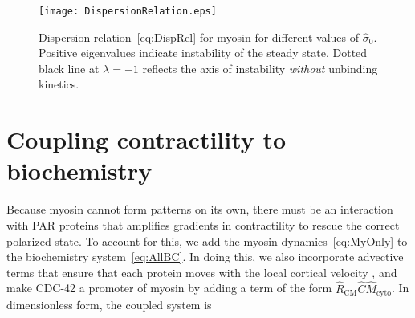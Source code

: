 \documentclass[11pt]{article}
\newcommand{\6}[1]{#1_{\text{6}}}
\newcommand{\3}[1]{#1_{\text{3}}}
\begin{document}
\begin{figure}
\centering
\texttt{[image: DispersionRelation.eps]}
\caption{\label{fig:DispRelMy}Dispersion relation\ \eqref{eq:DispRel} for myosin for different values of $\hat{\sigma}_0$. Positive eigenvalues indicate instability of the steady state. Dotted black line at $\lambda=-1$ reflects the axis of instability \emph{without} unbinding kinetics.}
\end{figure}


\section{Coupling contractility to biochemistry \label{sec:WithMy}}
Because myosin cannot form patterns on its own, there must be an interaction with PAR proteins that amplifies gradients in contractility to rescue the correct polarized state. To account for this, we add the myosin dynamics\ \eqref{eq:MyOnly} to the biochemistry system\ \eqref{eq:AllBC}. In doing this, we also incorporate advective terms that ensure that each protein moves with the local cortical velocity \cite{illukkumbura2023design}, and make CDC-42 a promoter of myosin by adding a term of the form $\hat R_\text{CM} \hat C \hat{M}_\text{cyto}$. In dimensionless form, the coupled system is 
\end{document}
